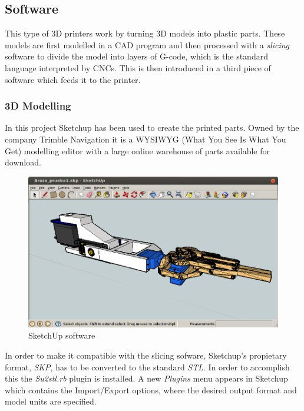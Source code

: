 \subsection{Software}
	This type of 3D printers work by turning 3D models into plastic parts. These models are first modelled in a CAD program and then processed with a \textit{slicing} software to divide the model into layers of G-code, which is the standard language interpreted by CNCs. This is then introduced in a third piece of software which feeds it to the printer.

		\subsubsection{3D Modelling }
		In this project Sketchup has been used to create the printed parts. Owned by the company Trimble Navigation it is a WYSIWYG (What You See Is What You Get) modelling editor with a large online warehouse of parts available for download. \\

			\begin{figure}[H]
				\centering
				\includegraphics[scale=0.4]{images/ProjectComponents/sketchup-arm.png}
				\caption{SketchUp software}
				\label{}
			\end{figure}
			\bigskip

		In order to make it compatible with the slicing sofware, Sketchup's propietary format, \textit{SKP}, has to be converted to the standard \textit{STL}. In order to accomplish this the \textit{Su2stl.rb} plugin is installed. A new \textit{Plugins} menu appears in Sketchup which contains the Import/Export options, where the desired output format and model units are specified.



